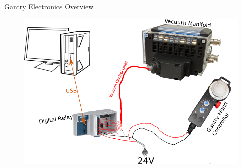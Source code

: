 \documentclass[english,aspectratio=43,8pt]{beamer}
\begin{document}
\begin{frame}{Gantry Electronics Overview}
    \begin{figure}
        \includegraphics[width=\textwidth]{figures/gantry_aux_electronics.png}
    \end{figure}
\end{frame}
\end{document}
